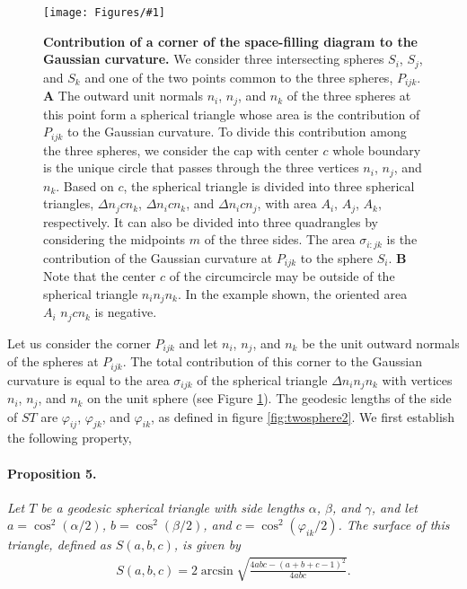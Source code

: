 \documentclass[11 pt]{article}
\theoremstyle{plain} \theorembodyfont{\rmfamily}
\newcommand{\centerfig}[2]{%
\centerline{\texttt{[image: Figures/\#1]}}
}
\begin{document}
  \begin{figure}[hbt]
\centerfig{Spherical}{height=2.5in}
\caption{ \textbf{Contribution of a corner of the space-filling diagram to the Gaussian curvature.} We consider three intersecting spheres $S_i$, $S_j$, and $S_k$ and one of the two points common to the three spheres, $P_{ijk}$. \textbf{A} The outward unit normals $n_i$, $n_j$, and $n_k$ of the three spheres at this point form a spherical triangle whose area is the contribution of $P_{ijk}$ to the Gaussian curvature. To divide this contribution among the three spheres, we consider the cap with center $c$ whole boundary is the unique circle that passes through the three vertices $n_i$, $n_j$, and $n_k$. Based on $c$, the spherical triangle is divided into three spherical triangles, $\Delta n_j c n_k$, $\Delta n_i c n_k$, and $\Delta n_i c n_j$, with area $A_i$, $A_j$, $A_k$, respectively. It can also be divided into three quadrangles by considering the midpoints $m$ of the three sides. The area $\sigma_{i:jk}$ is the contribution of the Gaussian curvature at $P_{ijk}$ to the sphere $S_i$. \textbf{B} Note that the center $c$ of the circumcircle may be outside of the spherical triangle $n_i n_j n_k$. In the example shown, the oriented area $A_i$ $n_j c n_k$ is negative.}
\label{fig:Spherical}
\end{figure}

  Let us consider the corner $P_{ijk}$ and let $n_i$, $n_j$, and $n_k$ be the unit outward normals of the spheres at $P_{ijk}$. The total contribution of this corner to the Gaussian curvature is equal to the area $\sigma_{ijk}$ of the spherical triangle $\Delta n_i n_j n_k$ with vertices $n_i$, $n_j$, and $n_k$ on the unit sphere (see Figure \ref{fig:Spherical}).   The geodesic lengths of the side of $ST$ are $\varphi_{ij}$, $\varphi_{jk}$, and $\varphi_{ik}$, as defined in figure \ref{fig:twosphere2}.  We first establish the following property,
\paragraph{Proposition 5.} \emph{Let $T$ be a geodesic spherical triangle with side lengths $\alpha$, $\beta$, and $\gamma$, and let $a=\cos^2(\alpha/2)$, $b=\cos^2(\beta/2)$, and $c=\cos^2(\varphi_{ik}/2)$. The surface of this triangle, defined as $S(a,b,c)$, is given by}
  \begin{eqnarray}
  S(a,b,c) = 2 \arcsin{\sqrt{ \frac{4abc - (a+b+c-1)^2}{4abc} } }.
  \end{eqnarray}
\end{document}
